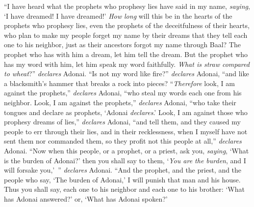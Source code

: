 \begin{biblechapter}
\verse “I have heard what the prophets who prophesy lies have said in my name, \textit{saying}, ‘I have dreamed! I have dreamed!’
\verse \textit{How long} will this be in the hearts of the prophets who prophesy lies, even the prophets of the deceitfulness of their hearts,
\verse who plan to make my people forget my name by their dreams that they tell each one to his neighbor, just as their ancestors forgot my name through Baal?
\verse The prophet who has with him a dream, let him tell the dream. But the prophet who has my word with him, let him speak my word faithfully. \textit{What is straw compared to wheat}?” \textit{declares} Adonai.
\verse “Is not my word like fire?” \textit{declares} Adonai, “and like a blacksmith’s hammer that breaks a rock into pieces?
\verse “\textit{Therefore} look, I am against the prophets,” \textit{declares} Adonai, “who steal my words each one from his neighbor.
\verse Look, I am against the prophets,” \textit{declares} Adonai, “who take their tongues and declare as prophets, ‘Adonai \textit{declares}.’
\verse Look, I am against those who prophesy dreams of lies,” \textit{declares} Adonai, “and tell them, and they caused my people to err through their lies, and in their recklessness, when I myself have not sent them nor commanded them, so they profit not this people at all,” \textit{declares} Adonai.
\verse “Now when this people, or a prophet, or a priest, ask you, \textit{saying}, ‘What is the burden of Adonai?’ then you shall say to them, ‘\textit{You are the burden}, and I will forsake you,’ ” \textit{declares} Adonai.
\verse “And the prophet, and the priest, and the people who say, ‘The burden of Adonai,’ I will punish that man and his house.
\verse Thus you shall say, each one to his neighbor and each one to his brother: ‘What has Adonai answered?’ or, ‘What has Adonai spoken?’

\end{biblechapter}
